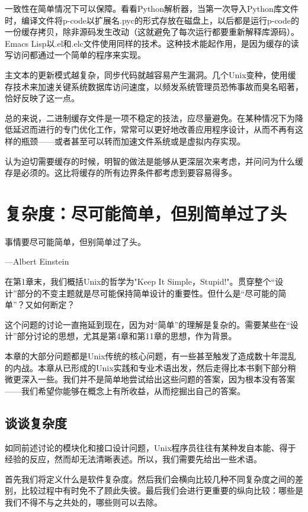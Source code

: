 \documentclass[12pt,oneside]{book}
\begin{document}
一致性在简单情况下可以保障。看看Python解析器，当第一次导入Python库文件时，编译文件将p-code以扩展名.pyc的形式存放在磁盘上，以后都是运行p-code的一份缓存拷贝，除非源码发生改动（这就避免了每次运行都要重新解释库源码）。Emacs Lisp以.el和.elc文件使用同样的技术。这种技术能起作用，是因为缓存的读写访问都通过一个简单的程序来实现。

主文本的更新模式越复杂，同步代码就越容易产生漏洞。几个Unix变种，使用缓存技术来加速关键系统数据库访问速度，以频发系统管理员恐怖事故而臭名昭著，恰好反映了这一点。

总的来说，二进制缓存文件是一项不稳定的技法，应尽量避免。在某种情况下为降低延迟而进行的专门优化工作，常常可以更好地改善应用程序设计，从而不再有这样的瓶颈——或者甚至可以转而加速文件系统或是虚拟内存实现。

认为迫切需要缓存的时候，明智的做法是能够从更深层次来考虑，并问问为什么缓存是必须的。这比将缓存的所有边界条件都考虑到要容易得多。



\chapter{复杂度：尽可能简单，但别简单过了头}
\begin{flushright}
事情要尽可能简单，但别简单过了头。

{\hfill —Albert Einstein}
\end{flushright}

在第1章末，我们概括Unix的哲学为"Keep It Simple，Stupid!"。贯穿整个“设计”部分的不变主题就是尽可能保持简单设计的重要性。但什么是“尽可能的简单”？又如何断定？

这个问题的讨论一直拖延到现在，因为对“简单”的理解是复杂的。需要某些在“设计”部分讨论的思想，尤其是第4章和第11章的思想，作为背景。

本章的大部分问题都是Unix传统的核心问题，有一些甚至触发了造成数十年混乱的内战。本章从已形成的Unix实践和专业术语出发，然后走得比本书剩下部分稍微更深入一些。我们并不是简单地尝试给出这些问题的答案，因为根本没有答案——我们希望你能够在概念上有所收益，从而挖掘出自己的答案。


\section{谈谈复杂度}
如同前述讨论的模块化和接口设计问题，Unix程序员往往有某种发自本能、得于经验的反应，然而却无法清晰表述。所以，我们需要先给出一些术语。

首先我们将定义什么是软件复杂度。然后我们会横向比较几种不同复杂度之间的差别，比较过程中有时免不了顾此失彼。最后我们会进行更重要的纵向比较：哪些是我们不得不与之共处的，哪些则可以去除。
\end{document}
